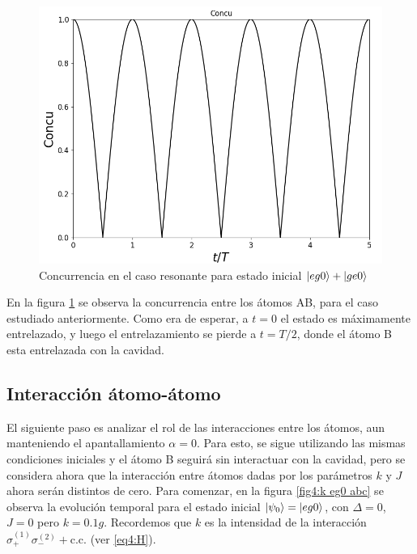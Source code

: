 \begin{figure}[H]
    \begin{minipage}[c]{0.67\textwidth}
        \includegraphics[width=\textwidth]{figuras/ch4/d eg0+ concu d=0.png}
    \end{minipage}\hfill
    \begin{minipage}[c]{0.3\textwidth}
    \caption{Concurrencia en el caso resonante para estado inicial $\ket{eg0}+\ket{ge0}$} 
    \label{fig4:concu eg0 sim}
  \end{minipage}
\end{figure}
En la figura \ref{fig4:concu eg0 sim} se observa la concurrencia entre los átomos AB, para el caso estudiado anteriormente. Como era de esperar, a $t=0$ el estado es máximamente entrelazado, y luego el entrelazamiento se pierde a $t=T/2$, donde el átomo B esta entrelazada con la cavidad. 

\subsection{Interacción átomo-átomo}

El siguiente paso es analizar el rol de las interacciones entre los átomos, aun manteniendo el apantallamiento $\alpha=0$. Para esto, se sigue utilizando las mismas condiciones iniciales y el átomo B seguirá sin interactuar con la cavidad, pero se considera ahora que la interacción entre átomos dadas por los parámetros $k$ y $J$ ahora serán distintos de cero. Para comenzar, en la figura \ref{fig4:k eg0 abc} se observa la evolución temporal para el estado inicial $\ket{\psi_0}=\ket{eg0}$, con $\Delta = 0$, $J=0$ pero $k=0.1g$. Recordemos que $k$ es la intensidad de la interacción $\sigma^{(1)}_+\sigma^{(2)}_-+\text{c.c.}$ (ver \ref{eq4:H}).

